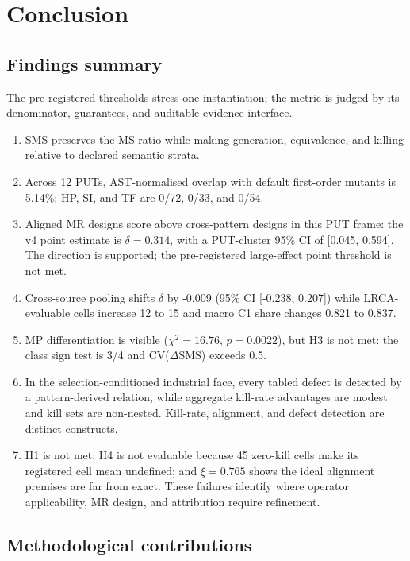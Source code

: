 \documentclass[review,12pt,authoryear]{elsarticle}
\begin{document}


\section{Conclusion}\label{conclusion}

\subsection{Findings summary}\label{findings-summary}

The pre-registered thresholds stress one instantiation; the metric is
judged by its denominator, guarantees, and auditable evidence interface.

\begin{enumerate}
\item
  SMS preserves the MS ratio while making generation, equivalence, and
  killing relative to declared semantic strata.
\item
  Across 12 PUTs, AST-normalised overlap with default first-order
  mutants is 5.14\%; HP, SI, and TF are 0/72, 0/33, and 0/54.
\item
  Aligned MR designs score above cross-pattern designs in this PUT
  frame: the v4 point estimate is \(\delta=0.314\), with a
  PUT-cluster 95\% CI of [0.045, 0.594]. The direction is supported;
  the pre-registered large-effect point threshold is not met.
\item
  Cross-source pooling shifts \(\delta\) by -0.009 (95\% CI
  [-0.238, 0.207]) while LRCA-evaluable cells increase 12 to 15 and
  macro C1 share changes 0.821 to 0.837.
\item
  MP differentiation is visible (\(\chi^2=16.76\), \(p=0.0022\)), but
  H3 is not met: the class sign test is 3/4 and
  CV(\(\Delta\)SMS) exceeds 0.5.
\item
  In the selection-conditioned industrial face, every tabled defect is
  detected by a pattern-derived relation, while aggregate kill-rate
  advantages are modest and kill sets are non-nested. Kill-rate,
  alignment, and defect detection are distinct constructs.
\item
  H1 is not met; H4 is not evaluable because 45 zero-kill cells make
  its registered cell mean undefined; and \(\xi=0.765\) shows the ideal
  alignment premises are far from exact. These failures identify where
  operator applicability, MR design, and attribution require refinement.
\end{enumerate}

\subsection{Methodological contributions}\label{methodological-contributions}
\end{document}
